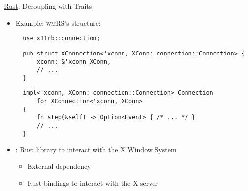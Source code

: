 \begin{frame}[fragile]{\underline{Rust}: Decoupling with Traits \hfill {\footnotesize \currentname}}


    \begin{itemize}

        \item Example: \textsc{wmRS}'s  structure:\\
\begin{verbatim}
  use x11rb::connection;
\end{verbatim}
\begin{verbatim}
  pub struct XConnection<'xconn, XConn: connection::Connection> {
      xconn: &'xconn XConn,
      // ...
  }
\end{verbatim}
\begin{verbatim}
  impl<'xconn, XConn: connection::Connection> Connection
      for XConnection<'xconn, XConn>
  {
      fn step(&self) -> Option<Event> { /* ... */ }
      // ...
  }
\end{verbatim}

        \item {}: Rust library to interact with the X Window System\\
            \begin{itemize}
                \item External dependency
                \item Rust bindings to interact with the X server
            \end{itemize}

    \end{itemize}

    \vfill

\end{frame}

